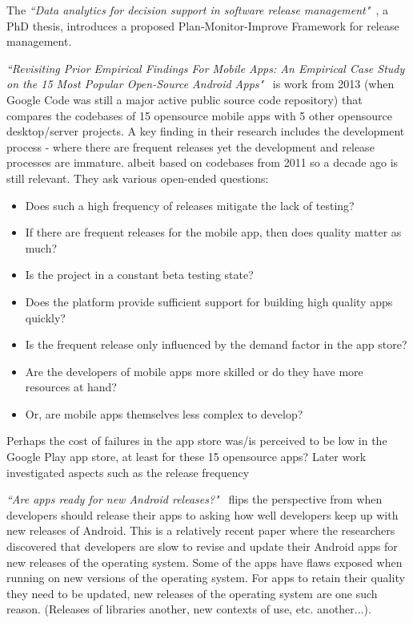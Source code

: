     
The \emph{``Data analytics for decision support in software release management"}~\cite{didar2018data_analytics_phd_thesis}, a PhD thesis, introduces a proposed Plan-Monitor-Improve Framework for release management.

\emph{``Revisiting Prior Empirical Findings For Mobile Apps: An Empirical Case Study on the 15 Most Popular Open-Source Android Apps"}~\citep{syer2013_empirical_findings_for_mobile_apps} is work from 2013 (when Google Code was still a major active public source code repository) that compares the codebases of 15 opensource mobile apps with 5 other opensource desktop/server projects. A key finding in their research includes the development process - where there are frequent releases yet the development and release processes are immature. albeit based on codebases from 2011 so a decade ago is still relevant. They ask various open-ended questions:
    \begin{itemize}
        \item Does such a high frequency of releases mitigate the lack of testing? 
        \item If there are frequent releases for the mobile app, then does quality matter as much?
        \item Is the project in a constant beta testing state? 
        \item Does the platform provide sufficient support for building high quality apps quickly? 
        \item Is the frequent release only influenced by the demand factor in the app store? 
        \item Are the developers of mobile apps more skilled or do they have more resources at hand? 
        \item Or, are mobile apps themselves less complex to develop?
    \end{itemize}
    
Perhaps the cost of failures in the app store was/is perceived to be low in the Google Play app store, at least for these 15 opensource apps? Later work investigated aspects such as the release frequency~\citep{nayebi2016release}

    
\emph{``Are apps ready for new Android releases?"}~\citet{guilardi_are_apps_ready_for_new_android_releases} flips the perspective from when developers should release their apps to asking how well developers keep up with new releases of Android. This is a relatively recent paper where the researchers discovered that developers are slow to revise and update their Android apps for new releases of the operating system. Some of the apps have flaws exposed when running on new versions of the operating system. For apps to retain their quality they need to be updated, new releases of the operating system are one such reason. (Releases of libraries another, new contexts of use, etc. another...).


